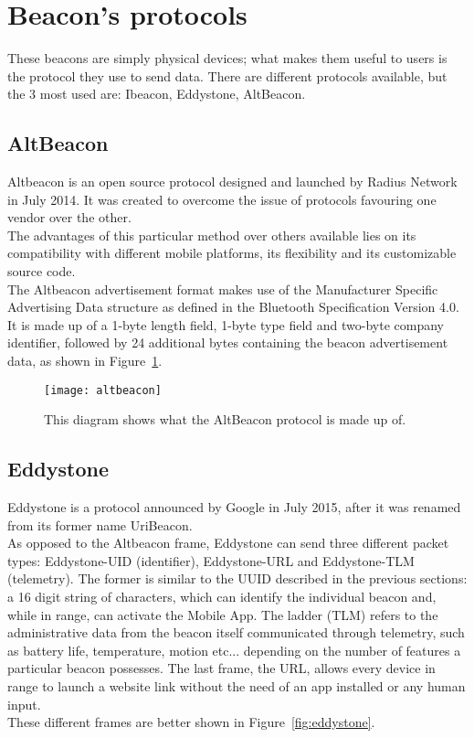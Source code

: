 \clearpage
\section{Beacon's protocols}
These beacons are simply physical devices; what makes them useful to users is the protocol they use to send data. There are different protocols available, but the 3 most used are: Ibeacon, Eddystone, AltBeacon.
\subsection{AltBeacon}
Altbeacon is an open source protocol designed and launched by Radius Network in July 2014. It was created to overcome the issue of protocols favouring one vendor over the other.\\
The advantages of this particular method over others available lies on its compatibility with different mobile platforms, its flexibility and its customizable source code.\\
The Altbeacon advertisement format makes use of the Manufacturer Specific Advertising Data structure as defined in the Bluetooth Specification Version 4.0. It is made up of a 1-byte length field, 1-byte type field and two-byte company identifier, followed by 24 additional bytes containing the beacon advertisement data, as shown in Figure~\ref{fig:altbeacon}.

	\begin{figure}[h]
		\centering
		\texttt{[image: altbeacon]}
		\caption{This diagram shows what the AltBeacon protocol is made up of.}
		\label{fig:altbeacon}
	\end{figure}

\subsection{Eddystone}
Eddystone is a protocol announced by Google in July 2015, after it was renamed from its former name UriBeacon.\\
As opposed to the Altbeacon frame, Eddystone can send three different packet types: Eddystone-UID (identifier), Eddystone-URL and Eddystone-TLM (telemetry). The former is similar to the UUID described in the previous sections: a 16 digit string of characters, which can identify the individual beacon and, while in range, can activate the Mobile App. The ladder (TLM) refers to the administrative data from the beacon itself communicated through telemetry, such as battery life, temperature, motion etc... depending on the number of features a particular beacon possesses.
The last frame, the URL, allows every device in range to launch a website link without the need of an app installed or any human input.\\
These different frames are better shown in Figure~\ref{fig:eddystone}.\\

